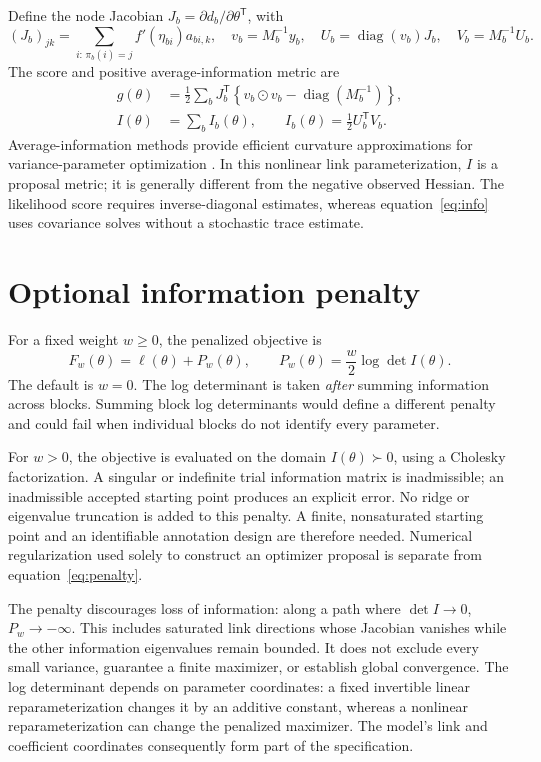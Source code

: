 \documentclass[11pt]{article}
\newcommand{\diag}{\operatorname{diag}}
\begin{document}
Define the node Jacobian $J_b=\partial d_b/\partial\theta^\mathsf{T}$, with
\begin{equation}
 (J_b)_{jk}=\sum_{i:\,\pi_b(i)=j}f'(\eta_{bi})a_{bi,k},\quad
 v_b=M_b^{-1}y_b,\quad U_b=\diag(v_b)J_b,\quad V_b=M_b^{-1}U_b.
\end{equation}
The score and positive average-information metric are
\begin{align}
 g(\theta)&=\frac12\sum_b J_b^\mathsf{T}\left\{v_b\odot v_b-\diag(M_b^{-1})\right\},\label{eq:score}\\
 I(\theta)&=\sum_b I_b(\theta),\qquad I_b(\theta)=\frac12U_b^\mathsf{T}V_b.\label{eq:info}
\end{align}
Average-information methods provide efficient curvature approximations for variance-parameter optimization \cite{gilmour}. In this nonlinear link parameterization, $I$ is a proposal metric; it is generally different from the negative observed Hessian. The likelihood score requires inverse-diagonal estimates, whereas equation~\eqref{eq:info} uses covariance solves without a stochastic trace estimate.

\section{Optional information penalty}
For a fixed weight $w\geq0$, the penalized objective is
\begin{equation}
 F_w(\theta)=\ell(\theta)+P_w(\theta),\qquad
 P_w(\theta)=\frac{w}{2}\log\det I(\theta).
 \label{eq:penalty}
\end{equation}
The default is $w=0$. The log determinant is taken \emph{after} summing information across blocks. Summing block log determinants would define a different penalty and could fail when individual blocks do not identify every parameter.

For $w>0$, the objective is evaluated on the domain $I(\theta)\succ0$, using a Cholesky factorization. A singular or indefinite trial information matrix is inadmissible; an inadmissible accepted starting point produces an explicit error. No ridge or eigenvalue truncation is added to this penalty. A finite, nonsaturated starting point and an identifiable annotation design are therefore needed. Numerical regularization used solely to construct an optimizer proposal is separate from equation~\eqref{eq:penalty}.

The penalty discourages loss of information: along a path where $\det I\to0$, $P_w\to-\infty$. This includes saturated link directions whose Jacobian vanishes while the other information eigenvalues remain bounded. It does not exclude every small variance, guarantee a finite maximizer, or establish global convergence. The log determinant depends on parameter coordinates: a fixed invertible linear reparameterization changes it by an additive constant, whereas a nonlinear reparameterization can change the penalized maximizer. The model's link and coefficient coordinates consequently form part of the specification.
\end{document}
